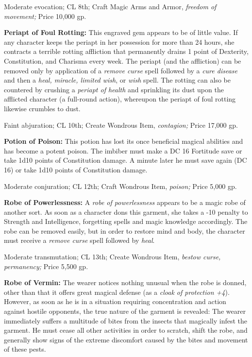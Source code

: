 \documentclass{article}
\begin{document}
Moderate evocation; CL 8th; Craft Magic Arms and Armor, \textit{freedom of movement; 
}Price 10,000 gp.

\textbf{Periapt of Foul Rotting:} This engraved gem appears to be of little value. 
If any character keeps the periapt in her possession for more than 24 hours, she 
contracts a terrible rotting affliction that permanently drains 1 point of Dexterity, 
Constitution, and Charisma every week. The periapt (and the affliction) can be 
removed only by application of a \textit{remove curse }spell followed by a \textit{cure 
disease }and then a \textit{heal, miracle, limited wish}, or \textit{wish }spell. 
The rotting can also be countered by crushing a \textit{periapt of health }and 
sprinkling its dust upon the afflicted character (a full-round action), whereupon 
the periapt of foul rotting likewise crumbles to dust.

Faint abjuration; CL 10th; Create Wondrous Item, \textit{contagion; }Price 17,000 
gp.

\textbf{Potion of Poison:} This potion has lost its once beneficial magical abilities 
and has become a potent poison. The imbiber must make a DC 16 Fortitude save or 
take 1d10 points of Constitution damage. A minute later he must save again (DC 
16) or take 1d10 points of Constitution damage.

Moderate conjuration; CL 12th; Craft Wondrous Item, \textit{poison; }Price 5,000 
gp.

\textbf{Robe of Powerlessness: }A \textit{robe of powerlessness }appears to be 
a magic robe of another sort. As soon as a character dons this garment, she takes 
a -10 penalty to Strength and Intelligence, forgetting spells and magic knowledge 
accordingly. The robe can be removed easily, but in order to restore mind and body, 
the character must receive a \textit{remove curse }spell followed by \textit{heal}.

Moderate transmutation; CL 13th; Create Wondrous Item, \textit{bestow curse, permanency; 
}Price 5,500 gp.

\textbf{Robe of Vermin:} The wearer notices nothing unusual when the robe is donned, 
other than that it offers great magical defense (as a \textit{cloak of protection 
+4}). However, as soon as he is in a situation requiring concentration and action 
against hostile opponents, the true nature of the garment is revealed: The wearer 
immediately suffers a multitude of bites from the insects that magically infest 
the garment. He must cease all other activities in order to scratch, shift the 
robe, and generally show signs of the extreme discomfort caused by the bites and 
movement of these pests.
\end{document}
